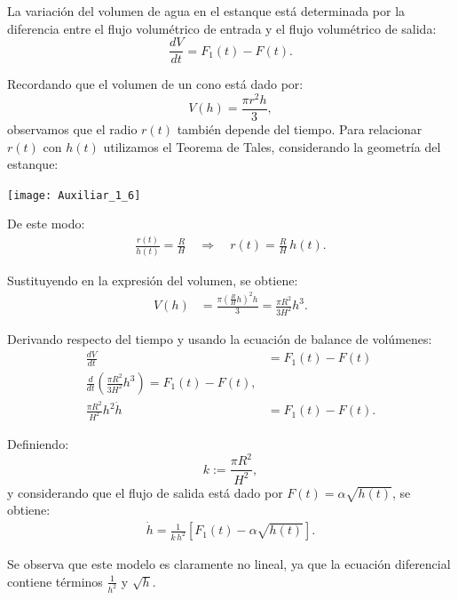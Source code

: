 \documentclass[
  11pt,
  letterpaper,
   addpoints,
   answers
  ]{exam}
\begin{document}
\begin{questions}
\begin{solution}
La variación del volumen de agua en el estanque está determinada por la diferencia entre el flujo volumétrico de entrada y el flujo volumétrico de salida:
\begin{equation}
    \frac{dV}{dt} = F_1(t) - F(t).
\end{equation}

Recordando que el volumen de un cono está dado por:
\begin{equation}
    V(h) = \frac{\pi r^2 h}{3},
\end{equation}
observamos que el radio \(r(t)\) también depende del tiempo. Para relacionar \(r(t)\) con \(h(t)\) utilizamos el Teorema de Tales, considerando la geometría del estanque:

\begin{center}
    \texttt{[image: Auxiliar\_1\_6]}
\end{center}

De este modo:
\begin{align}
    \frac{r(t)}{h(t)} = \frac{R}{H} 
    \quad \Rightarrow \quad 
    r(t) = \frac{R}{H} \, h(t).
\end{align}

Sustituyendo en la expresión del volumen, se obtiene:
\begin{align}
    V(h) &= \frac{\pi \left( \frac{R}{H} h \right)^2 h}{3} 
    = \frac{\pi R^2}{3 H^2} h^3.
\end{align}

Derivando respecto del tiempo y usando la ecuación de balance de volúmenes:
\begin{align}
    \frac{dV}{dt} &= F_1(t) - F(t) \\
    \frac{d}{dt} \left( \frac{\pi R^2}{3 H^2} h^3 \right) = F_1(t) - F(t), \\
    \frac{\pi R^2}{H^2} h^2 \dot{h} &= F_1(t) - F(t).
\end{align}

Definiendo:
\begin{equation}
    k := \frac{\pi R^2}{H^2},
\end{equation}
y considerando que el flujo de salida está dado por \(F(t) = \alpha \sqrt{h(t)}\), se obtiene:
\begin{align}
    \dot{h} = \frac{1}{k\, h^{2}} \left[ F_1(t) - \alpha \sqrt{h(t)} \right].
\end{align}

Se observa que este modelo es claramente no lineal, ya que la ecuación diferencial contiene términos $\frac{1}{h^2}$ y $\sqrt{h}$.


\end{solution}
\end{questions}
\end{document}
